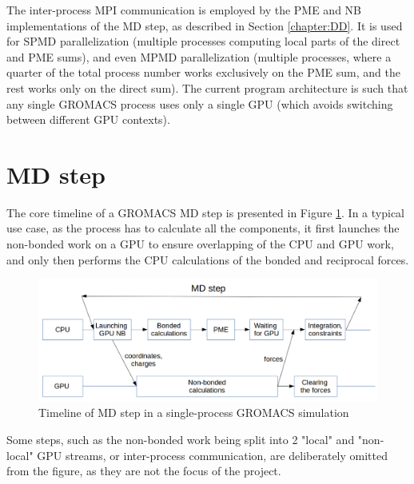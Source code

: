 \documentclass[12pt,a4paper,notitlepage]{report}
\newcommand{\draft}[1]{#1}
\begin{document}
The inter-process MPI communication is employed by the PME and NB implementations of the MD step, as described in Section \ref{chapter:DD}. It is used for SPMD parallelization (multiple processes computing local parts of the direct and PME sums), and even MPMD parallelization (multiple processes, where a quarter of the total process number works exclusively on the PME sum, and the rest works only on the direct sum). The current program architecture is such that any single GROMACS process uses only a single GPU (which avoids switching between different GPU contexts). 

\section{MD step}
\FloatBarrier
The core timeline of a GROMACS MD step is presented in Figure \ref{fig:step-orig}. In a typical use case, as the process has to calculate all the components, it first launches the non-bonded work on a GPU to ensure overlapping of the CPU and GPU work, and only then performs the CPU calculations of the bonded and reciprocal forces. 
\begin{figure} [hptb]
    \centering
    \includegraphics[width=1\textwidth]{pics/mdstep-orig.png}
    \caption{Timeline of MD step in a single-process GROMACS simulation}
    \label{fig:step-orig}
\end{figure}
\FloatBarrier

Some steps, such as  the non-bonded work being split into 2 "local" and "non-local" GPU streams, or inter-process communication, are deliberately omitted from the figure, as they are not the focus of the project. 

\end{document}
